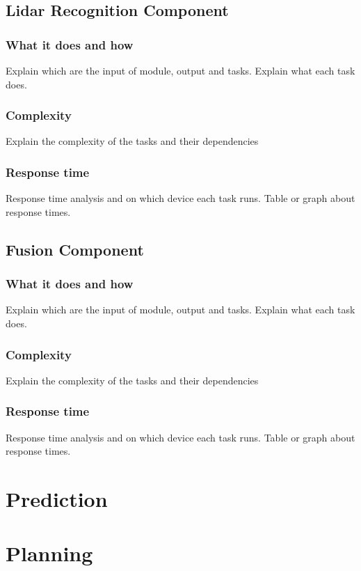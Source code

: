 \documentclass[conference]{IEEEtran}
\begin{document}
\subsection{Lidar Recognition Component}

\subsubsection{What it does and how}
Explain which are the input of module, output and tasks.
Explain what each task does.
\subsubsection{Complexity}
Explain the complexity of the tasks and their dependencies
\subsubsection{Response time}
Response time analysis and on which device each task runs.
Table or graph about response times.

\subsection{Fusion Component}

\subsubsection{What it does and how}
Explain which are the input of module, output and tasks.
Explain what each task does.
\subsubsection{Complexity}
Explain the complexity of the tasks and their dependencies
\subsubsection{Response time}
Response time analysis and on which device each task runs.
Table or graph about response times.

\section{Prediction}

\section{Planning}
\end{document}
